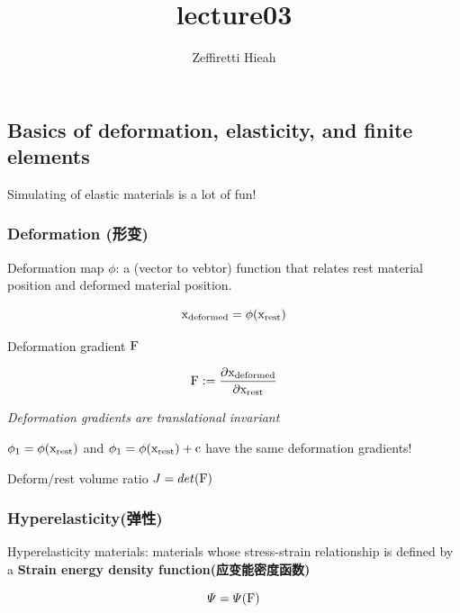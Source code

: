 \documentclass[11pt]{article}
\title{lecture03}
\author{Zeffiretti Hieah}
\begin{document}
    
    \maketitle
    
    

    
    \hypertarget{basics-of-deformation-elasticity-and-finite-elements}{%
\subsection{Basics of deformation, elasticity, and finite
elements}\label{basics-of-deformation-elasticity-and-finite-elements}}

Simulating of elastic materials is a lot of fun!

\hypertarget{deformation-ux5f62ux53d8}{%
\subsubsection{Deformation (形变)}\label{deformation-ux5f62ux53d8}}

Deformation map \(\phi\): a (vector to vebtor) function that relates
rest material position and deformed material position.

\begin{equation*}
{\rm x_{deformed}}=\phi({\rm x_{rest}})
\end{equation*}

Deformation gradient \({\rm F}\)

\begin{equation*}
{\rm F}:=\displaystyle\frac{\partial{\rm x_{deformed}}}{\partial{\rm x_{rest}}}
\end{equation*}

\emph{Deformation gradients are translational invariant}

\(\phi_{1}=\phi({\rm x_{rest}})\) and
\(\phi_{1}=\phi({\rm x_{rest}})+{\rm c}\) have the same deformation
gradients!

Deform/rest volume ratio \(J=det({\rm F})\)

\hypertarget{hyperelasticityux5f39ux6027}{%
\subsubsection{Hyperelasticity(弹性)}\label{hyperelasticityux5f39ux6027}}

Hyperelasticity materials: materials whose stress-strain relationship is
defined by a \textbf{Strain energy density function(应变能密度函数)}

\begin{equation}
\varPsi = \varPsi({\rm F})
\end{equation}
\end{document}
